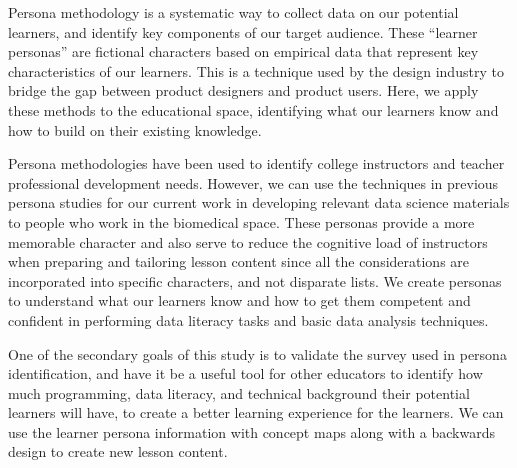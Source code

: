 \documentclass[020-persona\_validation.tex]{subfiles}
\begin{document}
    Persona methodology is a systematic way to collect data on our potential learners,
    and identify key components of our target audience.
    These ``learner personas'' are fictional characters based on empirical data that represent key characteristics
    of our learners.
    This is a technique used by the design industry to bridge the gap between product designers and product users.
    Here, we apply these methods to the educational space,
    identifying what our learners know and how to build on their existing knowledge.

    Persona methodologies have been used to identify
    college instructors and teacher professional development needs.
    However, we can use the techniques in previous persona studies
    for our current work in developing relevant data science materials to people who
    work in the biomedical space.
    These personas provide a more memorable character and also serve to reduce the cognitive load of instructors
    when preparing and tailoring lesson content since all the considerations are incorporated into specific characters,
    and not disparate lists.
    We create personas to understand what our learners know and how to get them competent and confident
    in performing data literacy tasks and basic data analysis techniques.


    One of the secondary goals of this study is to validate the survey used in persona identification,
    and have it be a useful tool for other educators to identify how much
    programming, data literacy, and technical background their potential learners will have,
    to create a better learning experience for the learners.
    We can use the learner persona information with concept maps along with a backwards design
    to create new lesson content.

\end{document}
